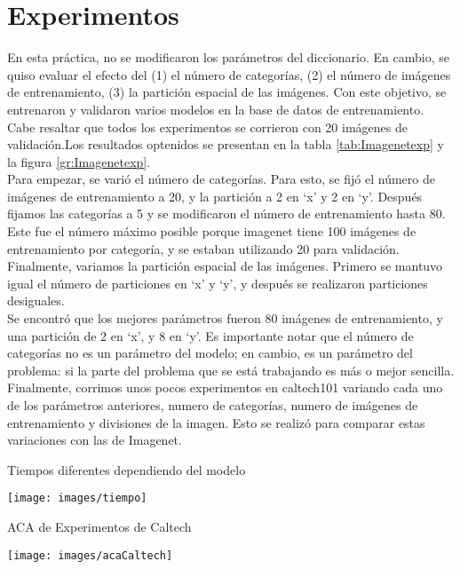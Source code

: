 \documentclass[10pt,twocolumn,letterpaper]{article}
\begin{document}
\section{Experimentos}
En esta práctica, no se modificaron los parámetros del diccionario. En cambio, se quiso evaluar el efecto del (1) el número de categorías, (2) el número de imágenes de entrenamiento, (3) la partición espacial de las imágenes. 
Con este objetivo, se entrenaron y validaron varios modelos en la base de datos de entrenamiento. Cabe resaltar que todos los experimentos se corrieron con 20 imágenes de validación.Los resultados optenidos se presentan en la tabla \ref{tab:Imagenetexp} y la figura \ref{gr:Imagenetexp}. \\
Para empezar, se varió el número de categorías. Para esto, se fijó el número de imágenes de entrenamiento a 20, y la partición a 2 en ‘x’ y 2 en ‘y’. Después fijamos las categorías a 5 y se modificaron el número de entrenamiento hasta 80. Este fue el número máximo posible porque imagenet tiene 100 imágenes de entrenamiento por categoría, y se estaban utilizando 20 para validación. Finalmente, variamos la partición espacial de las imágenes. Primero se mantuvo igual el número de particiones en ‘x’ y ‘y’, y después se realizaron particiones desiguales. \\
Se encontró que los mejores parámetros fueron 80 imágenes de entrenamiento, y una partición de 2 en ‘x’, y 8 en ‘y’. Es importante notar que el número de categorías no es un parámetro del modelo; en cambio, es un parámetro del problema: si la parte del problema que se está trabajando es más o mejor sencilla. 
\\
Finalmente, corrimos unos pocos experimentos en caltech101 variando cada uno de los parámetros anteriores, numero de categorías, numero de imágenes de entrenamiento y divisiones de la imagen. Esto se realizó para comparar estas variaciones con las de Imagenet.

\begin{table}[h]
\caption{Tiempos diferentes dependiendo del modelo}
\texttt{[image: images/tiempo]}
\label{tab:tiempo}
\end{table}

\begin{table}[h]
\caption{ACA de Experimentos de Caltech}
\texttt{[image: images/acaCaltech]}
\label{tab:Caltechexp}
\end{table}
\end{document}
